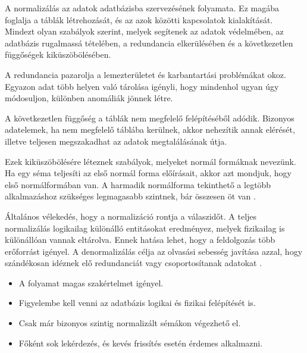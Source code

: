 
A normalizálás az adatok adatbázisba szervezésének folyamata. Ez magába foglalja a táblák létrehozását, és az azok közötti kapcsolatok kialakítását. Mindezt olyan szabályok szerint, melyek segítenek az adatok védelmében, az adatbázis rugalmassá tételében, a redundancia elkerülésében és a következetlen függőségek kiküszöbölésében.

A redundancia pazarolja a lemezterületet és karbantartási problémákat okoz. Egyazon adat több helyen való tárolása igényli, hogy mindenhol ugyan úgy módosuljon, különben anomáliák jönnek létre.

A következetlen függőség a táblák nem megfelelő felépítéséből adódik. Bizonyos adatelemek, ha nem megfelelő táblába kerülnek, akkor nehezítik annak elérését, illetve teljesen megszakadhat az adatok megtalálásának útja.

Ezek kiküszöbölésére léteznek szabályok, melyeket normál formáknak nevezünk. Ha egy séma teljesíti az első normál forma előírásait, akkor azt mondjuk, hogy első normálformában van. A harmadik normálforma tekinthető a legtöbb alkalmazáshoz szükséges legmagasabb szintnek, bár összesen öt van \cite{normaliz}.

Általános vélekedés, hogy a normalizáció rontja a válaszidőt. A teljes normalizálás logikailag különálló entitásokat eredményez, melyek fizikailag is különállóan vannak eltárolva. Ennek hatása lehet, hogy a feldolgozás több erőforrást igényel.
A denormalizálás célja az olvasási sebesség javítása azzal, hogy szándékosan idéznek elő redundanciát vagy csoportosítanak adatokat \cite{denormaliz}.
\begin{itemize}
\item A folyamat magas szakértelmet igényel.
\item Figyelembe kell venni az adatbázis logikai és fizikai felépítését is.
\item Csak már bizonyos szintig normalizált sémákon végezhető el.
\item Főként sok lekérdezés, és kevés frissítés esetén érdemes alkalmazni.
\end{itemize}



